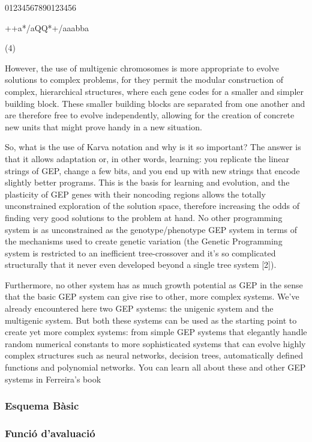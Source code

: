 \documentclass[titlepage,a4paper,12pt]{book}
\begin{document}
01234567890123456 	 

++a*/aQQ*+/aaabba
	

(4)

However, the use of multigenic chromosomes is more appropriate to evolve solutions to complex problems, for they permit the modular construction of complex, hierarchical structures, where each gene codes for a smaller and simpler building block. These smaller building blocks are separated from one another and are therefore free to evolve independently, allowing for the creation of concrete new units that might prove handy in a new situation.

So, what is the use of Karva notation and why is it so important? The answer is that it allows adaptation or, in other words, learning: you replicate the linear strings of GEP, change a few bits, and you end up with new strings that encode slightly better programs. This is the basis for learning and evolution, and the plasticity of GEP genes with their noncoding regions allows the totally unconstrained exploration of the solution space, therefore increasing the odds of finding very good solutions to the problem at hand. No other programming system is as unconstrained as the genotype/phenotype GEP system in terms of the mechanisms used to create genetic variation (the Genetic Programming system is restricted to an inefficient tree-crossover and it's so complicated structurally that it never even developed beyond a single tree system [2]).

Furthermore, no other system has as much growth potential as GEP in the sense that the basic GEP system can give rise to other, more complex systems. We've already encountered here two GEP systems: the unigenic system and the multigenic system. But both these systems can be used as the starting point to create yet more complex systems: from simple GEP systems that elegantly handle random numerical constants to more sophisticated systems that can evolve highly complex structures such as neural networks, decision trees, automatically defined functions and polynomial networks. You can learn all about these and other GEP systems in Ferreira's book


\subsubsection{Esquema Bàsic} %
\label{ssub:Esquema Basic}

\subsubsection{Funció d'avaluació} %
\label{ssub:funcio d'avaluacio}
\end{document}

